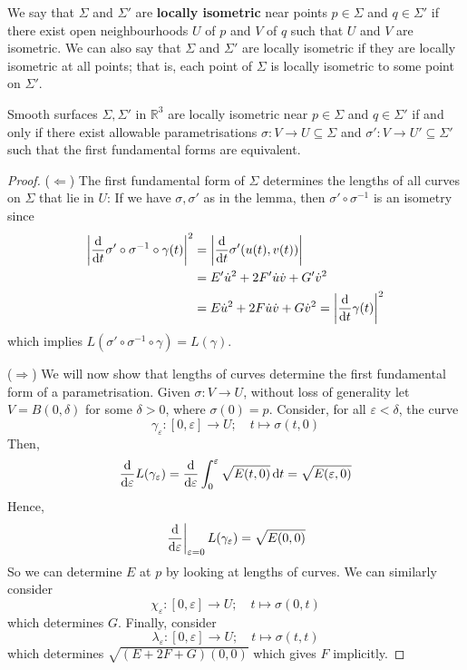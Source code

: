 \documentclass[a4paper]{article}
\begin{document}
\begin{definition}
	We say that \( \Sigma \) and \( \Sigma' \) are \textbf{locally isometric} near points \( p \in \Sigma \) and \( q \in \Sigma' \) if there exist open neighbourhoods \( U \) of \( p \) and \( V \) of \( q \) such that \( U \) and \( V \) are isometric.
	We can also say that \( \Sigma \) and \( \Sigma' \) are locally isometric if they are locally isometric at all points; that is, each point of \( \Sigma \) is locally isometric to some point on \( \Sigma' \).
\end{definition}
\begin{lemma}
	Smooth surfaces \( \Sigma, \Sigma' \) in \( \mathbb R^3 \) are locally isometric near \( p \in \Sigma \) and \( q \in \Sigma' \) if and only if there exist allowable parametrisations \( \sigma \colon V \to U \subseteq \Sigma \) and \( \sigma' \colon V \to U' \subseteq \Sigma' \) such that the first fundamental forms are equivalent.
\end{lemma}
\begin{proof}
	($ \Longleftarrow $) The first fundamental form of \( \Sigma \) determines the lengths of all curves on \( \Sigma \) that lie in \( U \): If we have $ \sigma,\sigma' $ as in the lemma, then $ \sigma'\circ \sigma^{-1} $ is an isometry since 
	\begin{align*}
		\abs{\dv{}{t}\sigma'\circ \sigma^{-1}\circ \gamma(t)}^2 &= \abs{\dv{}{t}\sigma'(u(t),v(t))}\\ 
		&= E'\dot{u}^2+2F' \dot{u}\dot{v}+G'\dot{v}^2\\ 
		&= E\dot{u}^2+2F \dot{u}\dot{v}+G\dot{v}^2 = \abs{\dv{}{t}\gamma(t)}^2
	\end{align*}
	which implies $ L(\sigma'\circ \sigma^{-1}\circ \gamma) = L(\gamma) $. 

	($\Longrightarrow$) We will now show that lengths of curves determine the first fundamental form of a parametrisation.
	Given \( \sigma \colon V \to U \), without loss of generality let \( V = B(0,\delta) \) for some \( \delta > 0 \), where \( \sigma(0) = p \).
	Consider, for all \( \varepsilon < \delta \), the curve
	\[
		\gamma_\varepsilon \colon [0,\varepsilon] \to U;\quad t \mapsto \sigma(t,0)
	\]
	Then,
	\[
		\dv{\varepsilon} L(\gamma_\varepsilon) = \dv{\varepsilon} \int_0^\varepsilon \sqrt{E(t,0)} \dd{t} = \sqrt{E(\varepsilon,0)}
	\]
	Hence,
	\[
		\eval{\dv{\varepsilon}}_{\varepsilon = 0} L(\gamma_\varepsilon) = \sqrt{E(0,0)}
	\]
	So we can determine \( E \) at \( p \) by looking at lengths of curves.
	We can similarly consider
	\[
		\chi_\varepsilon \colon [0,\varepsilon] \to U;\quad t \mapsto \sigma(0,t)
	\]
	which determines \( G \).
	Finally, consider
	\[
		\lambda_\varepsilon \colon [0,\varepsilon] \to U;\quad t \mapsto \sigma(t,t)
	\]
	which determines \( \sqrt{(E+2F+G)(0,0)} \) which gives \( F \) implicitly.
\end{proof}
\end{document}
